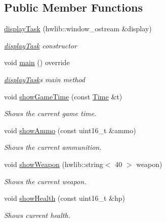 \subsection*{Public Member Functions}
\begin{DoxyCompactItemize}
\item 
\mbox{\hyperlink{classdisplay_task_a6eaac17d19e3292654fb5c1bb952f5a7}{display\+Task}} (hwlib\+::window\+\_\+ostream \&display)
\begin{DoxyCompactList}\small\item\em \mbox{\hyperlink{classdisplay_task}{display\+Task}} constructor \end{DoxyCompactList}\item 
void \mbox{\hyperlink{classdisplay_task_a8197696b737d9ff890833e2dcf93b546}{main}} () override
\begin{DoxyCompactList}\small\item\em \mbox{\hyperlink{classdisplay_task}{display\+Task}}\textquotesingle{}s main method \end{DoxyCompactList}\item 
void \mbox{\hyperlink{classdisplay_task_a367b1904f141adf0817c16ad8fb1eb44}{show\+Game\+Time}} (const \mbox{\hyperlink{class_time}{Time}} \&t)
\begin{DoxyCompactList}\small\item\em Shows the current game time. \end{DoxyCompactList}\item 
void \mbox{\hyperlink{classdisplay_task_a8cbad9cd4eb7783c2619550bb5e9fe04}{show\+Ammo}} (const uint16\+\_\+t \&ammo)
\begin{DoxyCompactList}\small\item\em Shows the current ammunition. \end{DoxyCompactList}\item 
void \mbox{\hyperlink{classdisplay_task_adefc6996b2cd23e2996bd93ef10a0bb8}{show\+Weapon}} (hwlib\+::string$<$ 40 $>$ weapon)
\begin{DoxyCompactList}\small\item\em Shows the current weapon. \end{DoxyCompactList}\item 
void \mbox{\hyperlink{classdisplay_task_aa202bda76b1663f4be2b009fb358bd0f}{show\+Health}} (const uint16\+\_\+t \&hp)
\begin{DoxyCompactList}\small\item\em Shows current health. \end{DoxyCompactList}\item 

\end{DoxyCompactItemize}
